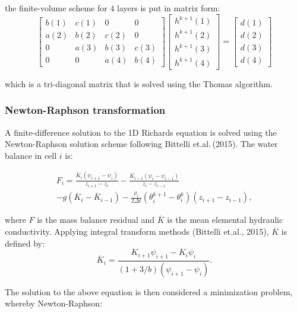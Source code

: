 \documentclass[10pt, letterpapr]{article}
\begin{document}
\noindent the finite-volume scheme for $4$ layers is put in matrix form:
\[
	\begin{bmatrix}
		b(1) & c(1) & 0 & 0 \\
		a(2) & b(2) & c(2) & 0 \\
		0 & a(3) & b(3) & c(3) \\
		0 & 0 & a(4) & b(4)
	\end{bmatrix}
	\begin{bmatrix}
		h^{k+1}(1) \\
		h^{k+1}(2) \\
		h^{k+1}(3) \\
		h^{k+1}(4)
	\end{bmatrix}
	=
	\begin{bmatrix}
		d(1) \\
		d(2) \\
		d(3) \\
		d(4)
	\end{bmatrix}
\]

\noindent which is a tri-diagonal matrix that is solved using the Thomas algorithm.


\subsubsection*{Newton-Raphson transformation}

A finite-difference solution to the 1D Richards equation is solved using the Newton-Raphson solution scheme following Bittelli et.al.\,(2015). The water balance in cell $i$ is:

\begin{multline*}
	F_i=\frac{\overline{K}_i\left(\psi_{i+1}-\psi_i\right)}{z_{i+1}-z_i}-\frac{\overline{K}_{i-1}\left(\psi_i-\psi_{i-1}\right)}{z_i-z_{i-1}} \\
		-g\left(\overline{K}_i-\overline{K}_{i-1}\right)-\frac{\rho_l}{2\Delta t}\left(\theta_i^{k+1}-\theta_i^k\right)\left(z_{i+1}-z_{i-1}\right),
\end{multline*}

\noindent where $F$ is the mass balance residual and $\overline{K}$ is the mean elemental hydraulic conductivity. Applying integral transform methods (Bittelli et.al., 2015), $\overline{K}$ is defined by: %
\[
	\overline{K}_i=\frac{K_{i+1}\psi_{i+1}-K_i\psi_i}{\left(1+3/b\right)\left(\psi_{i+1}-\psi_i\right)}.
\]

\noindent The solution to the above equation is then considered a minimization problem, whereby Newton-Raphson:
\end{document}
